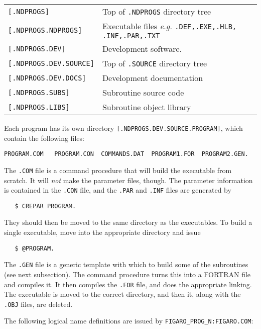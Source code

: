 \vspace{2mm}
\begin{tabular}{ll}                
{\tt [.NDPROGS]} &  Top of {\tt .NDPROGS} directory tree \\
{\tt [.NDPROGS.NDPROGS]} & Executable files {\it e.g.} {\tt .DEF,.EXE,.HLB,%
.INF,.PAR,.TXT} \\
{\tt [.NDPROGS.DEV]} & Development software.\\ 
{\tt [.NDPROGS.DEV.SOURCE]} & Top of {\tt .SOURCE} directory tree \\
{\tt [.NDPROGS.DEV.DOCS]} & Development documentation \\
{\tt [.NDPROGS.SUBS]} & Subroutine source code \\
{\tt [.NDPROGS.LIBS]} & Subroutine object library \\
\end{tabular}
\vspace{2mm}

Each program has its own directory {\tt [.NDPROGS.DEV.SOURCE.PROGRAM]}, 
which contain the following files:
\begin{verbatim}
PROGRAM.COM   PROGRAM.CON  COMMANDS.DAT  PROGRAM1.FOR  PROGRAM2.GEN.
\end{verbatim}
The {\tt .COM} file is a command procedure that will build the executable 
from scratch. It will {\em not} make the parameter files, though. The 
parameter information is contained in the {\tt .CON} file, and the {\tt .PAR} 
and {\tt .INF} files are generated by 
\begin{verbatim}
   $ CREPAR PROGRAM.
\end{verbatim}      
They should then be moved to the same directory as the executables. To
build a single executable, move into the appropriate directory and issue
\begin{verbatim}
   $ @PROGRAM.
\end{verbatim}
The {\tt .GEN} file is a generic template with which to build some of the
subroutines (see next subsection). The command procedure turns this into 
a FORTRAN file and compiles it. It then compiles the {\tt .FOR} file, and does 
the appropriate linking. The executable is moved to the correct directory, and 
then it, along with the {\tt .OBJ} files, are deleted.
 
The following logical name definitions are issued by 
{\tt FIGARO\_PROG\_N:FIGARO.COM}:
                                              
